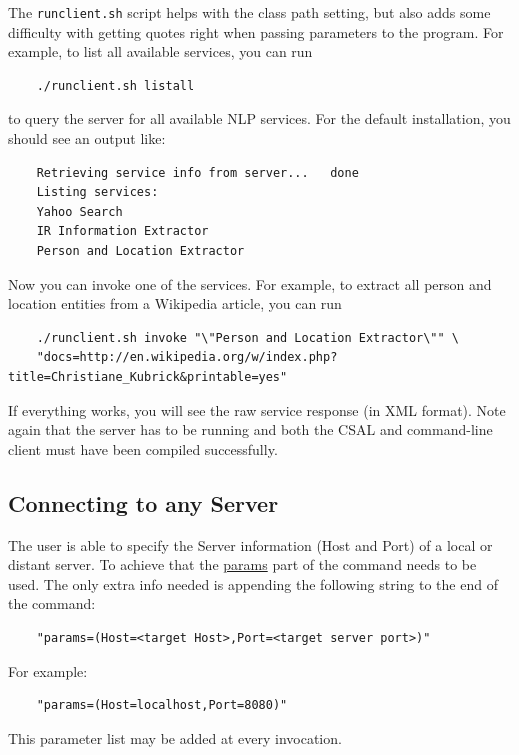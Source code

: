 The \texttt{runclient.sh} script helps with the
class path setting, but also adds some difficulty with getting quotes right
when passing parameters to the program. For example, to list all
available services, you can run
\begin{verbatim}
    ./runclient.sh listall
\end{verbatim}
to query the server for all available NLP services. For the default
installation, you should see an output like:
\begin{verbatim}
    Retrieving service info from server...   done
    Listing services:
    Yahoo Search
    IR Information Extractor
    Person and Location Extractor
\end{verbatim}
Now you can invoke one of the services. For example, to extract all
person and location entities from a Wikipedia article, you can run
\begin{verbatim}
    ./runclient.sh invoke "\"Person and Location Extractor\"" \
    "docs=http://en.wikipedia.org/w/index.php?title=Christiane_Kubrick&printable=yes"
\end{verbatim}
If everything works, you will see the raw service response (in XML
format).  Note again that the server has to be running and both the
CSAL and command-line client must have been compiled successfully.

\subsection*{Connecting to any Server}
The user is able to specify the Server information (Host and Port) of
a local or distant server.  To achieve that the \url{params} part of the
command needs to be used.  The only extra info needed is appending the
following string to the end of the command:
\begin{verbatim}
    "params=(Host=<target Host>,Port=<target server port>)"
\end{verbatim}

For example:
\begin{verbatim}
    "params=(Host=localhost,Port=8080)"
\end{verbatim}

This parameter list may be added at every invocation.

